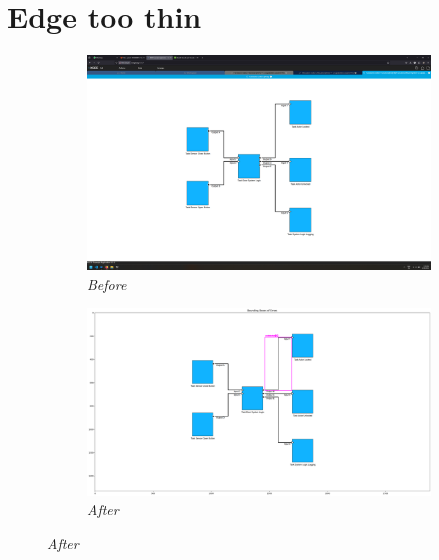 \documentclass{article}
\begin{document}

\section{Edge too thin}
\begin{figure}[H]
    \centering
    \begin{subfigure}[t]{0.9\textwidth}
        \centering
        \includegraphics[width=\textwidth]{testcases/edge_1px_too_thin/142331-026220_input_image.png}
        \caption*{\textit{Before}}
    \end{subfigure}
    \newline    
    \begin{subfigure}[t]{0.9\textwidth}
        \centering
        \includegraphics[width=\textwidth]{testcases/edge_1px_too_thin/142351-849844_element_bbox_errors_labeled_colored.png}
        \caption*{\textit{After}}
    \end{subfigure}
    \label{fig:edge_too_thin}
\end{figure}
\newpage
\end{document}
